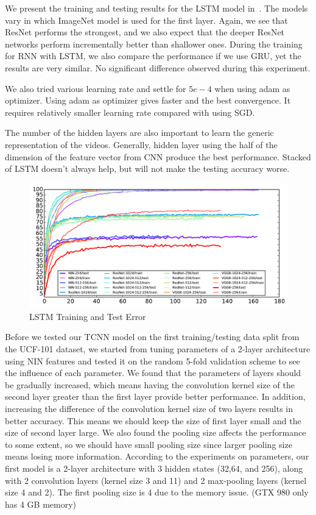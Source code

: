 We present the training and testing results for the LSTM model in~. The models vary in which ImageNet model is used for the first layer. Again, we see that ResNet performs the strongest, and we also expect that the deeper ResNet networks perform incrementally better than shallower ones. During the training for RNN with LSTM, we also compare the performance if we use GRU, yet the results are very similar. No significant difference observed during this experiment. 

We also tried various learning rate and settle for $5e-4$ when using adam as optimizer. Using adam as optimizer gives faster and the best convergence. It requires relatively smaller learning rate compared with using SGD. 

The number of the hidden layers are also important to learn the generic representation of the videos. Generally, hidden layer using the half of the dimension of the feature vector from CNN produce the best performance. Stacked of LSTM doesn't always help, but will not make the testing accuracy worse. 
\begin{figure}
  \centering
  \includegraphics[width=1.0\linewidth]{figs/RNNout}
  \caption{LSTM Training and Test Error}
  \label{fig:lstmtest}
\end{figure}

Before we tested our TCNN model on the first training/testing data split from the UCF-101 dataset, we started from tuning parameters of a 2-layer architecture using NIN features and tested it on the random 5-fold validation scheme to see the influence of each parameter. We found that the parameters of layers should be gradually increased, which means having the convolution kernel size of the second layer greater than the first layer provide better performance. In addition, increasing the difference of the convolution kernel size of two layers results in better accuracy. This means we should keep the size of first layer small and the size of second layer large. We also found the pooling size affects the performance to some extent, so we should have small pooling size since larger pooling size means losing more information. According to the experiments on parameters, our first model is a 2-layer architecture with 3 hidden states (32,64, and 256), along with 2 convolution layers (kernel size 3 and 11) and 2 max-pooling layers (kernel size 4 and 2). The first pooling size is 4 due to the memory issue. (GTX 980 only has 4 GB memory)

